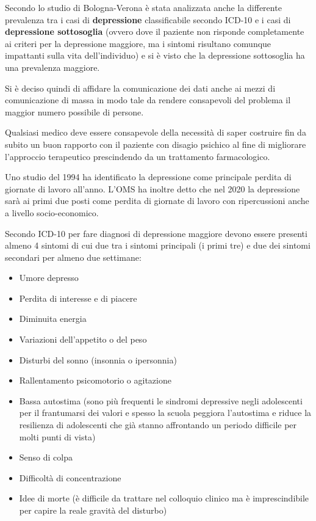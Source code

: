 Secondo
lo studio di Bologna-Verona è stata analizzata anche la differente
prevalenza tra i casi di \textbf{depressione} classificabile secondo
ICD-10 e i casi di \textbf{depressione sottosoglia} (ovvero dove il
paziente non risponde completamente ai criteri per la depressione
maggiore, ma i sintomi risultano comunque impattanti sulla vita
dell'individuo) e si è visto che la depressione sottosoglia ha una
prevalenza maggiore.

Si è deciso quindi di affidare la comunicazione dei dati anche ai mezzi
di comunicazione di massa in modo tale da rendere consapevoli del
problema il maggior numero possibile di persone.

Qualsiasi medico deve essere consapevole della necessità di saper
costruire fin da subito un buon rapporto con il paziente con disagio
psichico al fine di migliorare l'approccio terapeutico prescindendo da
un trattamento farmacologico.

Uno studio del 1994 ha identificato la depressione come principale
perdita di giornate di lavoro all'anno. L'OMS ha inoltre detto che nel
2020 la depressione sarà ai primi due posti come perdita di giornate di
lavoro con ripercussioni anche a livello socio-economico.

Secondo ICD-10 per fare diagnosi di depressione maggiore devono essere
presenti almeno 4 sintomi di cui due tra i sintomi principali (i primi
tre) e due dei sintomi secondari per almeno due settimane:

\begin{itemize}
\item
  Umore depresso
\item
  Perdita di interesse e di piacere
\item
  Diminuita energia
\item
  Variazioni dell'appetito o del peso
\item
  Disturbi del sonno (insonnia o ipersonnia)
\item
  Rallentamento psicomotorio o agitazione
\item
  Bassa autostima (sono più frequenti le sindromi depressive negli
  adolescenti per il frantumarsi dei valori e spesso la scuola peggiora
  l'autostima e riduce la resilienza di adolescenti che già stanno
  affrontando un periodo difficile per molti punti di vista)
\item
  Senso di colpa
\item
  Difficoltà di concentrazione
\item
  Idee di morte (è difficile da trattare nel colloquio clinico ma è
  imprescindibile per capire la reale gravità del disturbo)
\end{itemize}


